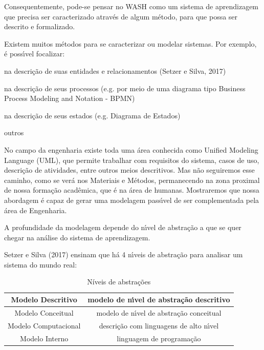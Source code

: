 \documentclass[
12pt,		%
openright,	%
twoside,  %
a4paper,			%
chapter=TITLE,		%
english,			%
french,				%
spanish,			%
brazil				%
]{USPSC-classe/USPSC}
\begin{document}
Consequentemente, pode-se pensar no WASH como um sistema de aprendizagem que precisa ser caracterizado atrav\'es de algum m\'etodo, para que possa ser descrito e formalizado.


Existem muitos m\'etodos para se caracterizar ou modelar sistemas. Por exemplo, \'e poss\'{\i}vel focalizar:



\begin{alineas}
\item na descri\c{c}\~ao de suas entidades e relacionamentos  (Setzer e Silva, 2017)
\item na descri\c{c}\~ao de seus processos (e.g. por meio de uma diagrama tipo Business Process Modeling and Notation - BPMN)
\item na descri\c{c}\~ao de seus estados (e.g. Diagrama de Estados)
\item outros
\end{alineas}

No campo da engenharia existe toda uma \'area conhecida como Unified Modeling Language (UML), que permite trabalhar com requisitos do sistema, casos de uso, descri\c{c}\~ao de atividades, entre outros meios descritivos. Mas n\~ao seguiremos esse caminho, como se ver\'a nos Materiais e M\'etodos, permanecendo na zona proximal de nossa forma\c{c}\~ao acad\^emica, que \'e na \'area de humanas. Mostraremos que nossa abordagem \'e capaz de gerar uma modelagem pass\'{\i}vel de ser complementada pela \'area de Engenharia.


A profundidade da modelagem depende do n\'{\i}vel de abstra\c{c}\~ao a que se quer chegar na an\'alise do sistema de aprendizagem.


Setzer e Silva (2017) ensinam que h\'a 4 n\'{\i}veis de abstra\c{c}\~ao para analisar um sistema do mundo real:






\begin{table}[htb]
\tiny
\caption{\label{9109a908c21da29338bc810a131d2186e9e7b0f9}N\'{i}veis de abstra\c{c}\~oes}

\centering
\begin{tabular}{|c|c|}
\hline
Modelo Descritivo  &  modelo de n\'{\i}vel de abstra\c{c}\~ao descritivo \\
\hline
Modelo Conceitual  &  modelo de n\'{\i}vel de abstra\c{c}\~ao conceitual \\
\hline
Modelo Computacional  &  descri\c{c}\~ao com linguagens de alto n\'{\i}vel \\
\hline
Modelo Interno  &  linguagem de programa\c{c}\~ao \\
\hline
\end{tabular}
\end{table}
\end{document}
